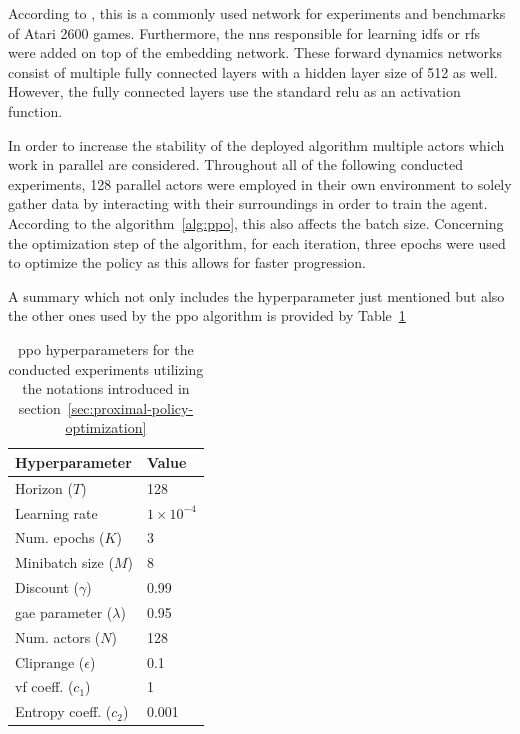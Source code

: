 \documentclass[draft,final]{vutinfth} %
\begin{document}
    According to \citet{burda_large-scale_2018-1}, this is a commonly used network for experiments and benchmarks of Atari 2600 games.
    Furthermore, the \glspl{nn} responsible for learning \glspl{idf} or \glspl{rf}  were added on top of the embedding network.
    These forward dynamics networks consist of multiple fully connected layers with a hidden layer size of 512 as well.
    However, the fully connected layers use the standard \gls{relu} as an activation function.

    In order to increase the stability of the deployed algorithm multiple actors which work in parallel are considered.
    Throughout all of the following conducted experiments, 128 parallel actors were employed in their own environment to solely gather data by interacting with their surroundings in order to train the agent.
    According to the algorithm~\ref{alg:ppo}, this also affects the batch size.
    Concerning the optimization step of the algorithm, for each iteration, three epochs were used to optimize the policy as this allows for faster progression.

    A summary which not only includes the hyperparameter just mentioned but also the other ones used by the \gls{ppo} algorithm is provided by Table~\ref{tab:ppo_params}

    \begin{table}[h]
        \centering
        \begin{tabular}{|l|l|}
            \hline
            Hyperparameter                       & Value              \\
            \hline
            Horizon ($T$)                        & 128                \\
            Learning rate                        & $1 \times 10^{-4}$ \\
            Num. epochs  ($K$)                     & 3                  \\
            Minibatch size ($M$)                 & 8                  \\
            Discount ($\gamma$)                  & 0.99               \\
            \acrshort{gae} parameter ($\lambda$) & 0.95               \\
            Num. actors ($N$)                    & 128                \\
            Cliprange ($\epsilon$)               & 0.1                \\
            \acrshort{vf} coeff. ($c_1$)         & 1                  \\
            Entropy coeff. ($c_2$)               & 0.001              \\
            \hline
        \end{tabular}
        \caption[\gls{ppo} hyperparameters for the conducted experiments]{\gls{ppo} hyperparameters for the conducted experiments utilizing the notations introduced in section~\ref{sec:proximal-policy-optimization}}
        \label{tab:ppo_params}
    \end{table}
\end{document}
